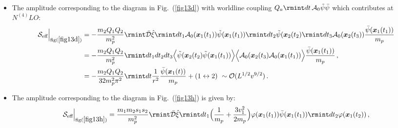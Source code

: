 \begin{itemize}
\begin{align}
\begin{split}
         =-\frac{m_2Q_1'Q_2'}{m_p^2}'\rmint dt_1dt_2dt_3\Big{\langle}\Tilde{\psi}(\boldsymbol{x}_2(t_2)\Tilde{\psi}(\boldsymbol{x}_1(t_1))\Big{\rangle}\Big{\langle}\mathcal{B}_0(\boldsymbol{x}_2(t_3))\mathcal{B}_0(\boldsymbol{x}_1(t_1))\Big{\rangle}\frac{\Bar{\psi}(\boldsymbol{x}_1(t_1))}{m_p}\,,\\&
       =-\frac{m_2Q_1'Q_2'}{32m_p^2\pi^2}\rmint dt \frac{e^{-\mu r}}{r^2}\frac{\Bar{\psi}(\boldsymbol{x}_1(t))}{m_p}\,+(1\leftrightarrow 2)\,\sim\mathcal{O}(L^{1/2}v^{9/2}).
    \end{split}
\end{align}
\item The amplitude corresponding to the diagram in Fig.~(\ref{fig13d}) with worldline coupling $Q_a\rmint dt\,\mathcal{A}_0\tilde\psi\Bar{\psi}$ which contributes at $N^{(4)}LO :$ 
\begin{align}
    \begin{split}
         \mathcal{S}_{\text{eff}}\Big |_{\text{fig}(\ref{fig13d})}&=-\frac{m_2Q_1Q_2}{m_p^2}\rmint\Bar{\mathcal{D}}\Hat{\xi}\rmint dt_1\mathcal{A}_0(\boldsymbol{x}_1(t_1))\Tilde{\psi}(\boldsymbol{x}_1(t_1))\rmint dt_2\Tilde{\psi}(\boldsymbol{x}_2(t_2)\rmint dt_3\mathcal{A}_0(\boldsymbol{x}_2(t_3))\frac{\Bar{\psi}(\boldsymbol{x}_1(t_1))}{m_p}\\&=-\frac{m_2Q_1Q_2}{m_p^2}\rmint dt_1dt_2dt_3\Big{\langle}\tilde{\psi}(\boldsymbol{x}_2(t_2)\tilde{\psi}(\boldsymbol{x}_1(t_1))\Big{\rangle}\Big{\langle}\mathcal{A}_0(\boldsymbol{x}_2(t_3)\mathcal{A}_0(\boldsymbol{x}_1(t_1))\Big{\rangle}\frac{\Bar{\psi}(\boldsymbol{x}_1(t_1))}{m_p}\,,\\&
       =-\frac{m_2Q_1Q_2}{32m_p^2\pi^2}\rmint dt \frac{1}{r^2}\frac{\Bar{\psi}(\boldsymbol{x}_1(t))}{m_p}+(1\leftrightarrow 2)\,\,\sim\mathcal{O}(L^{1/2}v^{9/2})\,.
    \end{split}
\end{align}
 \item The amplitude corresponding to the diagram in Fig.~(\ref{fig13h}) is given by: 
\begin{align}
    \begin{split}
         \mathcal{S}_{\text{eff}}\Big |_{\text{fig}(\ref{fig13h})}&=\frac{m_1m_2s_1s_2}{m_p^2}\rmint \Bar{\mathcal{D}}\hat{\xi}\rmint dt_1  \Big(\frac{1}{m_p}+\frac{3v_1^2}{2m_p}\Big)\varphi(\boldsymbol{x}_1(t_1)){\Bar{\psi}(\boldsymbol{x}_1(t_1))}\rmint dt_2\varphi(\boldsymbol{x}_1(t_2))\,,\\&

\end{split}
\end{align}
\end{itemize}
